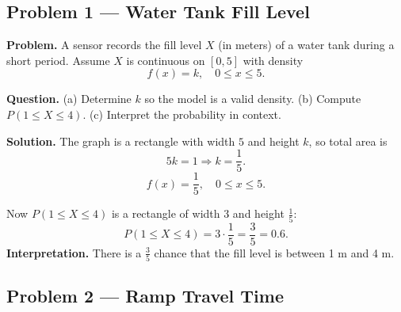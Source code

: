 


	
	
	\begin{ExamProblems}
		

		\item
		\subsection*{Problem 1 — Water Tank Fill Level}
		
		\textbf{Problem.}
		A sensor records the fill level $X$ (in meters) of a water tank during a short period.
		Assume $X$ is continuous on $[0,5]$ with density
		\[
		f(x)=k,\quad 0\le x\le 5.
		\]
		
		\textbf{Question.} 
		(a) Determine $k$ so the model is a valid density.
		(b) Compute $P(1\le X\le 4)$.
		(c) Interpret the probability in context.
		
		\textbf{Solution.}
		The graph is a rectangle with width $5$ and height $k$, so total area is
		\[
		5k=1\Rightarrow k=\frac{1}{5}.
		\]
		\[
		f(x)=\frac{1}{5},\quad 0\le x\le 5.
		\]
		\begin{center}
		\end{center}
		Now $P(1\le X\le 4)$ is a rectangle of width $3$ and height $\frac{1}{5}$:
		\[
		P(1\le X\le 4)=3\cdot\frac{1}{5}=\frac{3}{5}=0.6.
		\]
		\textbf{Interpretation.} There is a $\frac{3}{5}$ chance that the fill level is between 1 m and 4 m.
		
		
		\item
		\subsection*{Problem 2 — Ramp Travel Time}
		

\end{ExamProblems}
